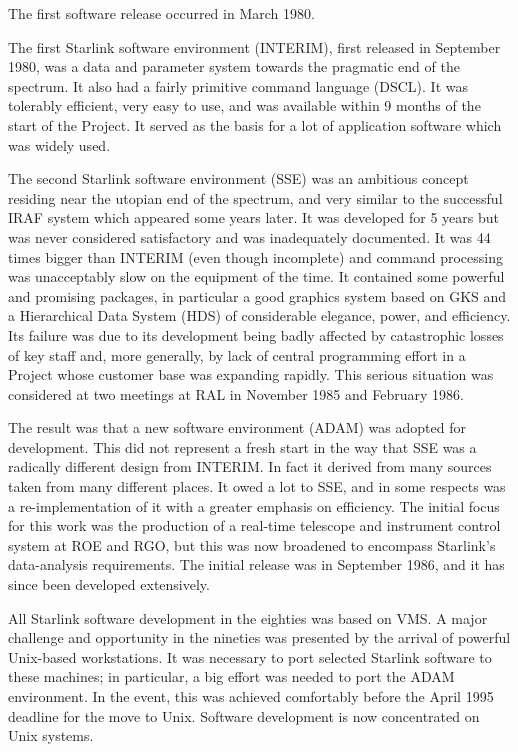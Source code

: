The first software release occurred in March 1980.

The first Starlink software environment (INTERIM), first released in
September 1980, was a data and parameter system towards the pragmatic end of
the spectrum.
It also had a fairly primitive command language (DSCL).
It was tolerably efficient, very easy to use, and was available within 9
months of the start of the Project.
It served as the basis for a lot of application software which was widely
used.

The second Starlink software environment (SSE) was an ambitious
concept residing near the utopian end of the spectrum, and very similar to the
successful IRAF system which appeared some years later.
It was developed for 5 years but was never considered satisfactory and was
inadequately documented.
It was 44 times bigger than INTERIM (even though incomplete) and command
processing was unacceptably slow on the equipment of the time.
It contained some powerful and promising packages, in particular a good
graphics system based on GKS and a Hierarchical Data System (HDS) of
considerable elegance, power, and efficiency.
Its failure was due to its development being badly affected by catastrophic
losses of key staff and, more generally, by lack of central programming
effort in a Project whose customer base was expanding rapidly.
This serious situation was considered at two meetings at RAL in November 1985
and February 1986.

The result was that a new software environment (ADAM) was adopted for
development.
This did not represent a fresh start in the way that SSE was a
radically different design from INTERIM.
In fact it derived from many sources taken from many different places.
It owed a lot to SSE, and in some respects was a re-implementation
of it with a greater emphasis on efficiency.
The initial focus for this work was the production of a real-time telescope
and instrument control system at ROE and RGO, but this was now broadened to
encompass Starlink's data-analysis requirements.
The initial release was in September 1986, and it has since been developed
extensively.

All Starlink software development in the eighties was based on VMS.
A major challenge and opportunity in the nineties was presented by the arrival
of powerful Unix-based workstations.
It was necessary to port selected Starlink software to these machines; in
particular, a big effort was needed to port the ADAM environment.
In the event, this was achieved comfortably before the April 1995 deadline for
the move to Unix.
Software development is now concentrated on Unix systems.

